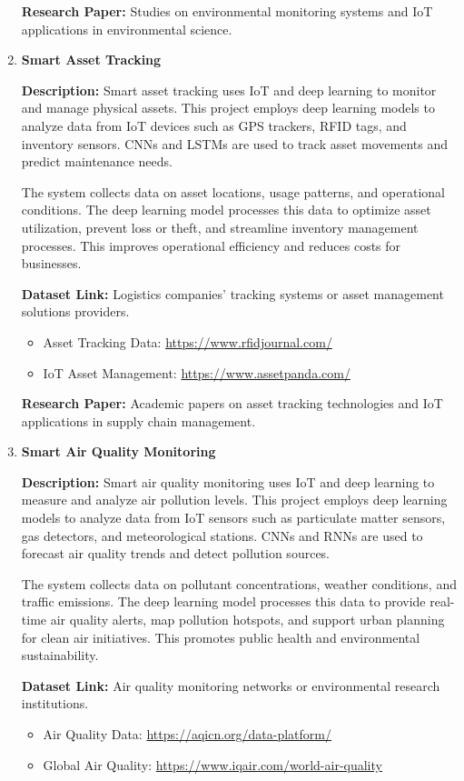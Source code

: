 \documentclass{article}
\begin{document}
\begin{enumerate}[label=\textbf{\arabic*.}, leftmargin=*]
\textbf{Research Paper:} Studies on environmental monitoring systems and IoT applications in environmental science.

\item \textbf{Smart Asset Tracking}

\textbf{Description:}
Smart asset tracking uses IoT and deep learning to monitor and manage physical assets. This project employs deep learning models to analyze data from IoT devices such as GPS trackers, RFID tags, and inventory sensors. CNNs and LSTMs are used to track asset movements and predict maintenance needs.

The system collects data on asset locations, usage patterns, and operational conditions. The deep learning model processes this data to optimize asset utilization, prevent loss or theft, and streamline inventory management processes. This improves operational efficiency and reduces costs for businesses.

\textbf{Dataset Link:} Logistics companies' tracking systems or asset management solutions providers.
\begin{itemize}
    \item Asset Tracking Data: \url{https://www.rfidjournal.com/}
    \item IoT Asset Management: \url{https://www.assetpanda.com/}
\end{itemize}

\textbf{Research Paper:} Academic papers on asset tracking technologies and IoT applications in supply chain management.

\item \textbf{Smart Air Quality Monitoring}

\textbf{Description:}
Smart air quality monitoring uses IoT and deep learning to measure and analyze air pollution levels. This project employs deep learning models to analyze data from IoT sensors such as particulate matter sensors, gas detectors, and meteorological stations. CNNs and RNNs are used to forecast air quality trends and detect pollution sources.

The system collects data on pollutant concentrations, weather conditions, and traffic emissions. The deep learning model processes this data to provide real-time air quality alerts, map pollution hotspots, and support urban planning for clean air initiatives. This promotes public health and environmental sustainability.

\textbf{Dataset Link:} Air quality monitoring networks or environmental research institutions.
\begin{itemize}
    \item Air Quality Data: \url{https://aqicn.org/data-platform/}
    \item Global Air Quality: \url{https://www.iqair.com/world-air-quality}
\end{itemize}


\end{enumerate}
\end{document}
